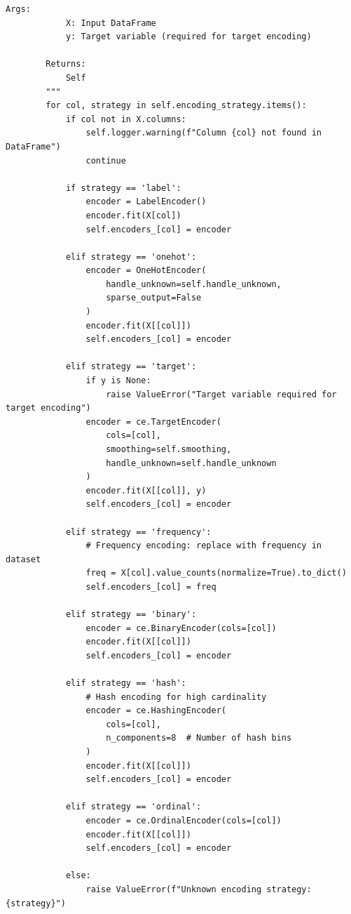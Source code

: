 \begin{lstlisting}[style=python, caption={Comprehensive Categorical Encoding Framework}]
        Args:
            X: Input DataFrame
            y: Target variable (required for target encoding)

        Returns:
            Self
        """
        for col, strategy in self.encoding_strategy.items():
            if col not in X.columns:
                self.logger.warning(f"Column {col} not found in DataFrame")
                continue

            if strategy == 'label':
                encoder = LabelEncoder()
                encoder.fit(X[col])
                self.encoders_[col] = encoder

            elif strategy == 'onehot':
                encoder = OneHotEncoder(
                    handle_unknown=self.handle_unknown,
                    sparse_output=False
                )
                encoder.fit(X[[col]])
                self.encoders_[col] = encoder

            elif strategy == 'target':
                if y is None:
                    raise ValueError("Target variable required for target encoding")
                encoder = ce.TargetEncoder(
                    cols=[col],
                    smoothing=self.smoothing,
                    handle_unknown=self.handle_unknown
                )
                encoder.fit(X[[col]], y)
                self.encoders_[col] = encoder

            elif strategy == 'frequency':
                # Frequency encoding: replace with frequency in dataset
                freq = X[col].value_counts(normalize=True).to_dict()
                self.encoders_[col] = freq

            elif strategy == 'binary':
                encoder = ce.BinaryEncoder(cols=[col])
                encoder.fit(X[[col]])
                self.encoders_[col] = encoder

            elif strategy == 'hash':
                # Hash encoding for high cardinality
                encoder = ce.HashingEncoder(
                    cols=[col],
                    n_components=8  # Number of hash bins
                )
                encoder.fit(X[[col]])
                self.encoders_[col] = encoder

            elif strategy == 'ordinal':
                encoder = ce.OrdinalEncoder(cols=[col])
                encoder.fit(X[[col]])
                self.encoders_[col] = encoder

            else:
                raise ValueError(f"Unknown encoding strategy: {strategy}")


\end{lstlisting}
